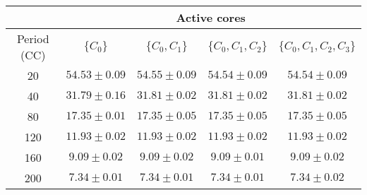 \begin{tabular}{c|c|c|c|c|}
    \cline{2-5}
                                        & \multicolumn{4}{c|}{Active cores} \\ \hline
    \multicolumn{1}{|c||}{Period (CC)}  & $\{C_{0}\}$ & $\{C_{0}, C_{1}\}$ & $\{C_{0}, C_{1}, C_{2}\}$ & $\{C_{0}, C_{1}, C_{2}, C_{3}\}$ \\ \hline \hline
    \multicolumn{1}{|c||}{20}           & $54.53 \pm 0.09$ & $54.55 \pm 0.09$ & $54.54 \pm 0.09$ & $54.54 \pm 0.09$ \\ \hline
    \multicolumn{1}{|c||}{40}           & $31.79 \pm 0.16$ & $31.81 \pm 0.02$ & $31.81 \pm 0.02$ & $31.81 \pm 0.02$ \\ \hline
    \multicolumn{1}{|c||}{80}           & $17.35 \pm 0.01$ & $17.35 \pm 0.05$ & $17.35 \pm 0.05$ & $17.35 \pm 0.05$ \\ \hline
    \multicolumn{1}{|c||}{120}          & $11.93 \pm 0.02$ & $11.93 \pm 0.02$ & $11.93 \pm 0.02$ & $11.93 \pm 0.02$ \\ \hline
    \multicolumn{1}{|c||}{160}          & $9.09 \pm 0.02$ & $9.09 \pm 0.02$ & $9.09 \pm 0.01$ & $9.09 \pm 0.02$ \\ \hline
    \multicolumn{1}{|c||}{200}          & $7.34 \pm 0.01$ & $7.34 \pm 0.01$ & $7.34 \pm 0.01$ & $7.34 \pm 0.02$ \\ \hline
\end{tabular}
